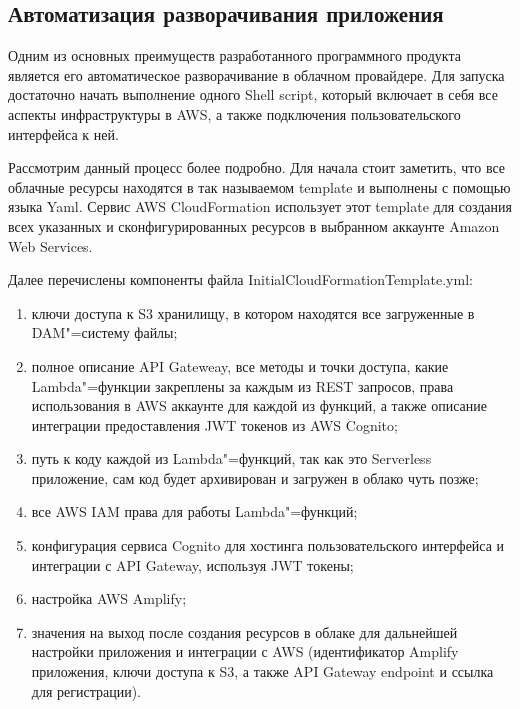 \subsection{Автоматизация разворачивания приложения}

Одним из основных преимуществ разработанного программного продукта является его автоматическое разворачивание в облачном провайдере. Для запуска достаточно начать выполнение одного Shell script, который включает в себя все аспекты инфраструктуры в AWS, а также подключения пользовательского интерфейса к ней.

Рассмотрим данный процесс более подробно. Для начала стоит заметить, что все облачные ресурсы находятся в так называемом template и выполнены с помощью языка Yaml. Сервис AWS CloudFormation использует этот template для создания всех указанных и сконфигурированных ресурсов в выбранном аккаунте Amazon Web Services. 

Далее перечислены компоненты файла InitialCloudFormationTemplate.yml:
\begin{enumerate}
\item ключи доступа к S3 хранилищу, в котором находятся все загруженные в DAM"=систему файлы;
\item полное описание API Gateweay, все методы и точки доступа, какие Lambda"=функции закреплены за каждым из REST запросов, права использования в AWS аккаунте для каждой из функций, а также описание интеграции предоставления JWT токенов из AWS Cognito;
\item путь к коду каждой из Lambda"=функций, так как это Serverless приложение, сам код будет архивирован и загружен в облако чуть позже;
\item все AWS IAM права для работы Lambda"=функций;
\item конфигурация сервиса Cognito для хостинга пользовательского интерфейса и интеграции с API Gateway, используя JWT токены;
\item настройка AWS Amplify;
\item значения на выход после создания ресурсов в облаке для дальнейшей настройки приложения и интеграции с AWS (идентификатор Amplify приложения, ключи доступа к S3, а также API Gateway endpoint и ссылка для регистрации).
\end{enumerate}


